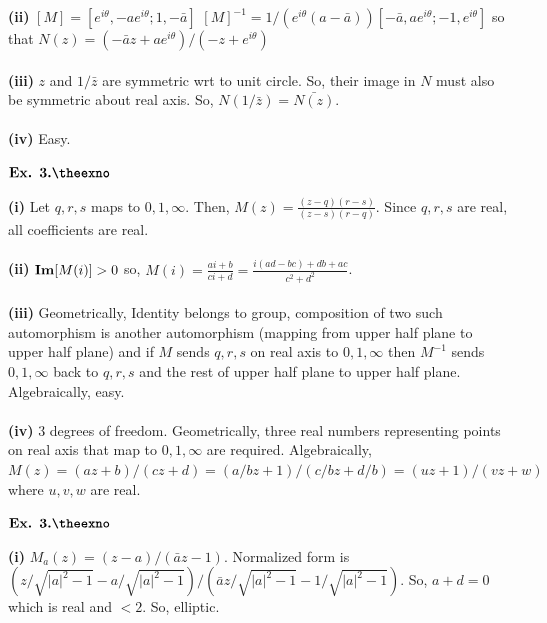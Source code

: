 \documentclass{article}
\def\tf{\textbf}
\def\mf{\ensuremath\mathbf}
\newcounter{exno}
\begin{document}
\tf{(ii)} $[M] = [e^{i\theta},-ae^{i\theta};1,-\bar{a}]$ $[M]^{-1} = 1/(e^{i\theta}(a-\bar{a}))[-\bar{a},ae^{i\theta};-1,e^{i\theta}]$ so that $N(z) = (-\bar{a}z+ae^{i\theta})/(-z+e^{i\theta})$\\~\\

\tf{(iii)} $z$ and $1/\bar{z}$ are symmetric wrt to unit circle. So, their image in $N$ must also be symmetric about real axis. So, $N(1/\bar{z}) = \bar{N(z)}$.\\~\\

\tf{(iv)} Easy.

\vspace{0.2in}

${\textbf{Ex. 3.\theexno}}$
\addtocounter{exno}{1}

\tf{(i)} Let $q,r,s$ maps to $0,1,\infty$. Then, $M(z) = \frac{(z-q)(r-s)}{(z-s)(r-q)}$. Since $q,r,s$ are real, all coefficients are real.\\~\\

\tf{(ii)} $\mf{Im}[M(i)] > 0$ so, $M(i) = \frac{ai+b}{ci+d} = \frac{i(ad-bc)+db+ac}{c^2+d^2}$.\\~\\

\tf{(iii)} Geometrically, Identity belongs to group, composition of two such automorphism is another automorphism (mapping from upper half plane to upper half plane) and if $M$ sends $q,r,s$ on real axis to $0,1,\infty$ then $M^{-1}$ sends $0,1,\infty$ back to $q,r,s$ and the rest of upper half plane to upper half plane. Algebraically, easy.\\~\\

\tf{(iv)} $3$ degrees of freedom. Geometrically, three real numbers representing points on real axis that map to $0,1,\infty$ are required. Algebraically, $M(z) = (az+b)/(cz+d) = (a/b z + 1)/(c/bz+d/b) = (uz+1)/(vz+w)$ where $u,v,w$ are real.

\vspace{0.2in}

${\textbf{Ex. 3.\theexno}}$
\addtocounter{exno}{1}

\tf{(i)} $M_a(z) = (z-a)/(\bar{a}z-1)$. Normalized form is $(z/\sqrt{|a|^2-1}-a/\sqrt{|a|^2-1})/(\bar{a}z/\sqrt{|a|^2-1}-1/\sqrt{|a|^2-1})$. So, $a+d = 0$ which is real and $<2$. So, elliptic.\\~\\
\end{document}
